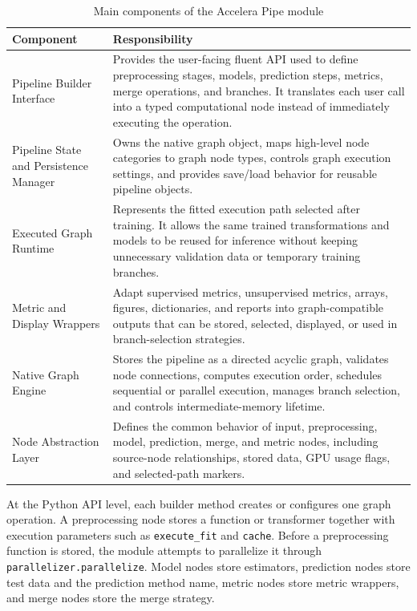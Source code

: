 \begin{table}[H]
\centering
\small
\renewcommand{\arraystretch}{1.15}
\setlength{\tabcolsep}{4pt}
\caption{Main components of the Accelera Pipe module}
\label{tab:accelera-pipe-components}
\begin{tabular}{p{}p{}}
\toprule
\textbf{Component} & \textbf{Responsibility} \\
\midrule
Pipeline Builder Interface &
Provides the user-facing fluent API used to define preprocessing stages, models,
prediction steps, metrics, merge operations, and branches. It translates each user
call into a typed computational node instead of immediately executing the operation. \\
\midrule
Pipeline State and Persistence Manager &
Owns the native graph object, maps high-level node categories to graph node types,
controls graph execution settings, and provides save/load behavior for reusable
pipeline objects. \\
\midrule
Executed Graph Runtime &
Represents the fitted execution path selected after training. It allows the same
trained transformations and models to be reused for inference without keeping
unnecessary validation data or temporary training branches. \\
\midrule
Metric and Display Wrappers &
Adapt supervised metrics, unsupervised metrics, arrays, figures, dictionaries, and
reports into graph-compatible outputs that can be stored, selected, displayed, or
used in branch-selection strategies. \\
\midrule
Native Graph Engine &
Stores the pipeline as a directed acyclic graph, validates node connections, computes
execution order, schedules sequential or parallel execution, manages branch
selection, and controls intermediate-memory lifetime. \\
\midrule
Node Abstraction Layer &
Defines the common behavior of input, preprocessing, model, prediction, merge, and
metric nodes, including source-node relationships, stored data, GPU usage flags, and
selected-path markers. \\
\bottomrule
\end{tabular}
\end{table}

At the Python API level, each builder method creates or configures one graph
operation. A preprocessing node stores a function or transformer together with
execution parameters such as \texttt{execute\_fit} and \texttt{cache}. Before a
preprocessing function is stored, the module attempts to parallelize it through
\texttt{parallelizer.parallelize}. Model nodes store estimators, prediction nodes
store test data and the prediction method name, metric nodes store metric wrappers,
and merge nodes store the merge strategy.

